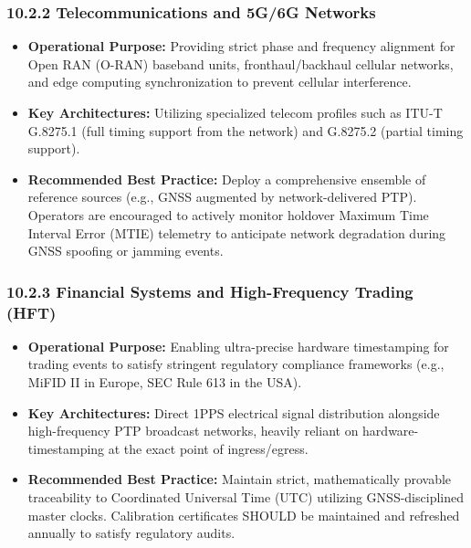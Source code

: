 \subsubsection{10.2.2 Telecommunications and 5G/6G
Networks}\label{telecommunications-and-5g6g-networks}

\begin{itemize}
\tightlist
\item
  \textbf{Operational Purpose:} Providing strict phase and frequency
  alignment for Open RAN (O-RAN) baseband units, fronthaul/backhaul
  cellular networks, and edge computing synchronization to prevent
  cellular interference.
\item
  \textbf{Key Architectures:} Utilizing specialized telecom profiles
  such as ITU-T G.8275.1 (full timing support from the network) and
  G.8275.2 (partial timing support).
\item
  \textbf{Recommended Best Practice:} Deploy a comprehensive ensemble of
  reference sources (e.g., GNSS augmented by network-delivered PTP).
  Operators are encouraged to actively monitor holdover Maximum Time
  Interval Error (MTIE) telemetry to anticipate network degradation
  during GNSS spoofing or jamming events.
\end{itemize}

\subsubsection{10.2.3 Financial Systems and High-Frequency Trading
(HFT)}\label{financial-systems-and-high-frequency-trading-hft}

\begin{itemize}
\tightlist
\item
  \textbf{Operational Purpose:} Enabling ultra-precise hardware
  timestamping for trading events to satisfy stringent regulatory
  compliance frameworks (e.g., MiFID II in Europe, SEC Rule 613 in the
  USA).
\item
  \textbf{Key Architectures:} Direct 1PPS electrical signal distribution
  alongside high-frequency PTP broadcast networks, heavily reliant on
  hardware-timestamping at the exact point of ingress/egress.
\item
  \textbf{Recommended Best Practice:} Maintain strict, mathematically
  provable traceability to Coordinated Universal Time (UTC) utilizing
  GNSS-disciplined master clocks. Calibration certificates SHOULD be
  maintained and refreshed annually to satisfy regulatory audits.
\end{itemize}

